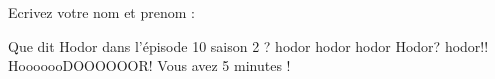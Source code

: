 \documentclass[a4paper, 11pt]{article}
\begin{document}
	Ecrivez votre nom et prenom :

	\begin{qcm}

		\question Que dit Hodor dans l'épisode 10 saison 2 ?
				\reponsejuste hodor
				\reponsejuste hodor hodor
				\reponsejuste Hodor? hodor!!
				\reponsejuste HooooooDOOOOOOR!
		Vous avez 5 minutes !
	\end{qcm}
\end{document}
